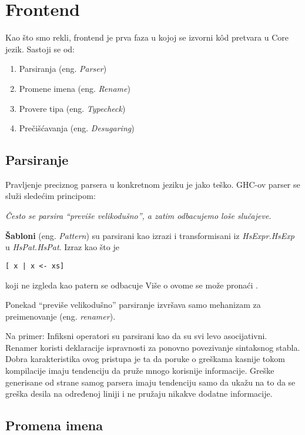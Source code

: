 \section{Frontend}
\label{sec:frontend}

Kao što smo rekli, frontend je prva faza u kojoj se izvorni k\^{o}d pretvara u Core jezik. Sastoji se od:
\begin{enumerate}
	\item Parsiranja (eng. \emph{Parser})
	\item Promene imena (eng. \emph{Rename}) 
	\item Provere tipa (eng. \emph{Typecheck})
	\item Prečišćavanja (eng. \emph{Desugaring})
\end{enumerate} 


\subsection{Parsiranje}
\label{subsec:podnaslovParse}

Pravljenje preciznog parsera u konkretnom jeziku je jako teško. GHC-ov parser se služi sledećim principom: 

\textit{Često se parsira “previše velikodušno”, a zatim odbacujemo loše slučajeve.}

\textbf{Šabloni} (eng. \emph{Pattern}) su parsirani kao izrazi i transformisani iz \textit{HsExpr.HsExp} u \textit{HsPat.HsPat}. Izraz kao što je
\begin{verbatim}
[ x | x <- xs]
\end{verbatim}  
koji ne izgleda kao patern se odbacuje Više o ovome se može pronaći \cite{GHCzz}.

Ponekad “previše velikodušno” parsiranje izvršava samo mehanizam za preimenovanje (eng. \emph{renamer}).

Na primer:
Infiksni operatori  su parsirani kao da su svi levo asocijativni. Renamer koristi deklaracije ispravnosti za ponovno povezivanje sintaksnog stabla. Dobra karakteristika ovog pristupa je ta da poruke o greškama kasnije tokom kompilacije imaju tendenciju da pruže mnogo korisnije informacije. Greške generisane od strane samog parsera imaju tendenciju samo da ukažu na to da se greška desila na određenoj liniji i ne pružaju nikakve dodatne informacije.

\subsection{Promena imena}
\label{subsec:podnaslovRename}

